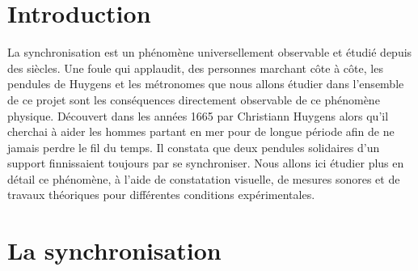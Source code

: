 \documentclass[a4paper,11pt]{report}
\begin{document}
\maketitle  %

\newpage  %
 \setcounter{page}{1} %


\newpage


{\tableofcontents} 
\listoffigures


\newpage


\chapter*{Introduction}
 \setcounter{page}{1} %

 La synchronisation est un phénomène universellement observable et étudié depuis des siècles. Une foule qui applaudit, des personnes marchant côte à côte, les pendules de Huygens et les métronomes que nous allons étudier dans l'ensemble de ce projet sont les conséquences directement observable de ce phénomène physique. Découvert dans les années 1665 par Christiann Huygens alors qu'il cherchai à aider les hommes partant en mer pour de longue période afin de ne jamais perdre le fil du temps. Il constata que deux pendules solidaires d'un support finnissaient toujours par se synchroniser. Nous allons ici étudier plus en détail ce phénomène, à l'aide de constatation visuelle, de mesures sonores et de travaux théoriques pour différentes conditions expérimentales.


\chapter{La synchronisation}
\end{document}
